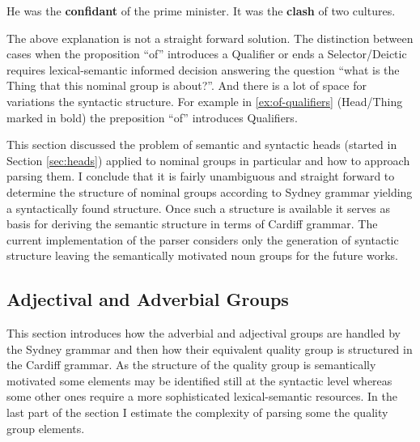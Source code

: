 \begin{exe}
    \ex \label{ex:of-qualifiers}He was the \textbf{confidant} of the prime minister.
    \ex It was the \textbf{clash} of two cultures.
\end{exe}

The above explanation is not a straight forward solution. The distinction between cases when the proposition ``of'' introduces a Qualifier or ends a Selector/Deictic requires lexical-semantic informed decision answering the question ``what is the Thing that this nominal group is about?''. And there is a lot of space for variations the syntactic structure. For example in \ref{ex:of-qualifiers} (Head/Thing marked in bold) the preposition ``of'' introduces Qualifiers.
 
This section discussed the problem of semantic and syntactic heads (started in Section \ref{sec:heads}) applied to nominal groups in particular and how to approach parsing them. I conclude that it is fairly unambiguous and straight forward to determine the structure of nominal groups according to Sydney grammar yielding a syntactically found structure. Once such a structure is available it serves as basis for deriving the semantic structure in terms of Cardiff grammar. The current implementation of the parser considers only the generation of syntactic structure leaving the semantically motivated noun groups for the future works. 

%
	
\subsection{Adjectival and Adverbial Groups}
	\label{sec:advectival-adverbial-groups}

    This section introduces how the adverbial and adjectival groups are handled by the Sydney grammar and then how their equivalent quality group is structured in the Cardiff grammar. As the structure of the quality group is semantically motivated some elements may be identified still at the syntactic level whereas some other ones require a more sophisticated lexical-semantic resources. In the last part of the section I estimate the complexity of parsing some the quality group elements. 

